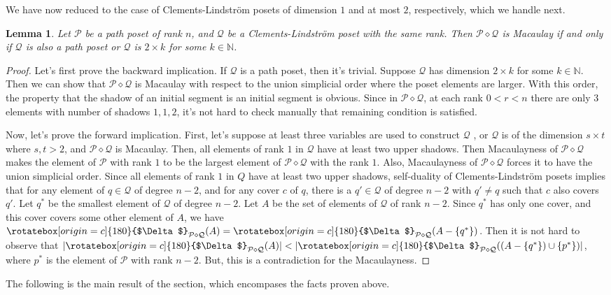 \documentclass[11pt, reqno]{amsart}
\newcommand{\N}{{\mathbb N}}
\newcommand{\Q}{{\mathcal Q}}
\renewcommand{\P}{{\mathcal P}}
\newcommand{\uSdw}{\rotatebox[origin=c]{180}{$\Delta$}}
\newcommand{\di}{\diamond}
\theoremstyle{plain} %
\newtheorem{lem}[thm]{Lemma}
\theoremstyle{definition}
\theoremstyle{remark}
\numberwithin{equation}{section}  %
\begin{document}
We have now reduced to the case of Clements-Lindstr\"om posets of dimension $1$ and at most $2$, respectively, which we handle next.

\begin{lem}\label{lem: path and 2 X k}
Let $\P$ be a path poset of rank $n$, and $\Q$ be a Clements-Lindstr\"om poset with the same rank. Then $\P \di \Q$ is Macaulay if and only if $\Q$ is also a path poset or $\Q$ is $2\times k$ for some $k \in \N$.
\end{lem}
\begin{proof}
Let's first prove the backward implication. If $\Q$ is a path poset, then it's trivial. Suppose $\Q$ has dimension $2\times k$ for some $k\in \N$. Then we can show that $\P\di \Q$ is Macaulay with respect to the union simplicial order where the poset elements are larger. With this order, the property that the shadow of an initial segment is an initial segment is obvious. Since in $\P\di \Q$, at each rank $0<r<n$ there are only $3$ elements with number of shadows $1,1,2$, it's not hard to check manually that remaining condition is satisfied.

Now, let's prove the forward implication. First, let's suppose at least three variables are used to construct $\Q$ , or $\Q$ is of the dimension $s\times t$ where $s,t>2$, and $\P \di \Q$ is Macaulay. Then, all elements of rank $1$ in $\Q$ have at least two upper shadows. Then Macaulayness of $\P\di \Q$ makes the element of $\P$ with rank $1$ to be the largest element of $\P\di \Q$ with the rank $1$. Also, Macaulayness of $\P\di \Q$ forces it to have the union simplicial order.  Since all elements of rank $1$ in $Q$ have at least two upper shadows, self-duality of Clements-Lindstr\"om posets implies that for any element of $q\in \Q$ of degree $n-2$, and for any cover $c$ of $q$, there is a $q'\in \Q$ of degree $n-2$ with $q'\ne q$ such that $c$ also covers $q'$. Let $q^*$ be the smallest element of $\Q$ of degree $n-2$. Let $A$ be the set of elements of $\Q$ of rank $n-2$. Since $q^*$ has only one cover, and this cover covers some other element of $A$, we have $\uSdw_{\P\di \Q}(A) = \uSdw_{\P\di \Q}(A-\{q^\ast\})$. Then it is not hard to observe that $\lvert\uSdw_{\P\di \Q}(A)\rvert < \lvert\uSdw_{\P\di \Q}((A- \{q^*\})\cup \{p^*\})\rvert$, where $p^*$ is the element of $\P$ with rank $n-2$. But, this is a contradiction for the Macaulayness. 
\end{proof}

The following is the main result of the section, which encompases the facts proven above.
\end{document}
